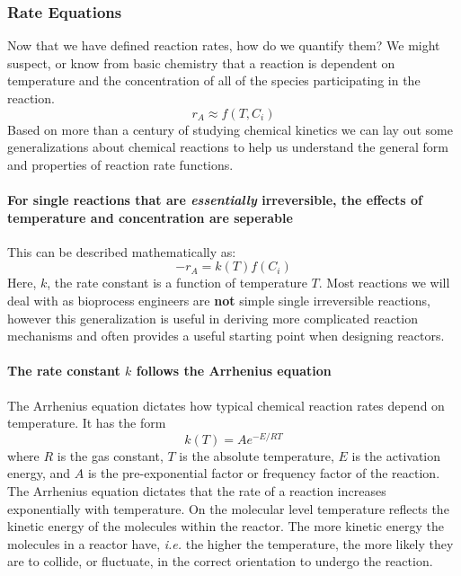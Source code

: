 \documentclass[
]{article}
\begin{document}
\hypertarget{rate-equations}{%
\subsubsection{Rate Equations}\label{rate-equations}}

Now that we have defined reaction rates, how do we quantify them? We might suspect, or know from basic chemistry that a reaction is dependent on temperature and the concentration of all of the species participating in the reaction.
\[r_A \approx f(T, C_i)\]
Based on more than a century of studying chemical kinetics we can lay out some generalizations about chemical reactions to help us understand the general form and properties of reaction rate functions.

\hypertarget{for-single-reactions-that-are-essentially-irreversible-the-effects-of-temperature-and-concentration-are-seperable}{%
\paragraph{\texorpdfstring{For single reactions that are \emph{essentially} irreversible, the effects of temperature and concentration are seperable}{For single reactions that are essentially irreversible, the effects of temperature and concentration are seperable}}\label{for-single-reactions-that-are-essentially-irreversible-the-effects-of-temperature-and-concentration-are-seperable}}

This can be described mathematically as:
\[-r_A = k(T)f(C_i)\]
Here, \(k\), the rate constant is a function of temperature \(T\).
Most reactions we will deal with as bioprocess engineers are \textbf{not} simple single irreversible reactions, however this generalization is useful in deriving more complicated reaction mechanisms and often provides a useful starting point when designing reactors.

\hypertarget{the-rate-constant-k-follows-the-arrhenius-equation}{%
\paragraph{\texorpdfstring{The rate constant \(k\) follows the Arrhenius equation}{The rate constant k follows the Arrhenius equation}}\label{the-rate-constant-k-follows-the-arrhenius-equation}}

The Arrhenius equation dictates how typical chemical reaction rates depend on temperature. It has the form
\[k(T) = Ae^{-E/RT}\]
where \(R\) is the gas constant, \(T\) is the absolute temperature, \(E\) is the activation energy, and \(A\) is the pre-exponential factor or frequency factor of the reaction. The Arrhenius equation dictates that the rate of a reaction increases exponentially with temperature. On the molecular level temperature reflects the kinetic energy of the molecules within the reactor. The more kinetic energy the molecules in a reactor have, \emph{i.e.} the higher the temperature, the more likely they are to collide, or fluctuate, in the correct orientation to undergo the reaction.
\end{document}
